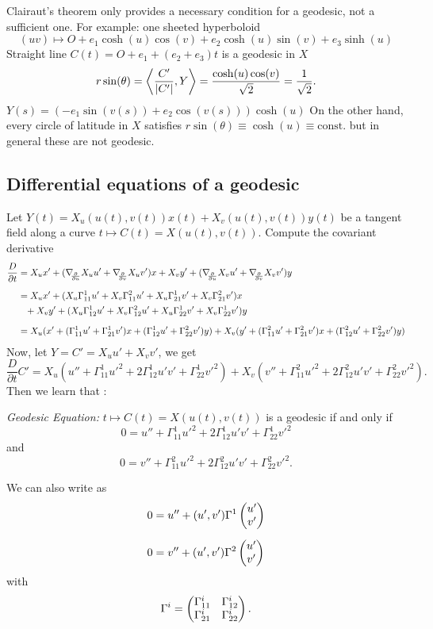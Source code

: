 \begin{remark, example}
	Clairaut's theorem only provides a necessary condition for a geodesic, not a sufficient one.
	For example: one sheeted hyperboloid
		\[ (uv) \mapsto O + e_1\cosh(u) \cos(v) + e_2 \cosh(u) \sin(v) + e_3 \sinh(u) \]
	Straight line $ C(t) = O + e_1 + (e_2 +e_3)t $ is a geodesic in $ X $
		\[r \sin (\theta) = \left \langle \dfrac{C'}{|C'|},Y \right\rangle = \dfrac{\cosh(u) \cos(v)}{\sqrt{2}}= \dfrac{1}{\sqrt{2}}. \]
	$ Y(s) = (-e_1\sin(v(s)) + e_2\cos(v(s)))\cosh(u) $
	On the other hand, every circle of latitude in $ X $ satisfies $ r\sin(\theta) \equiv \cosh(u) \equiv \mathrm{const.} $
	but in general these are not geodesic.	
\end{remark, example}

\subsection{Differential equations of a geodesic}
	
	Let $ Y(t) = X_u(u(t),v(t))x(t) + X_v(u(t),v(t))y(t) $ be a tangent field along a curve $ t \mapsto C(t) = X(u(t),v(t)). $
	Compute the covariant derivative
	\begin{align*}
		\dfrac{D}{\partial t} 
			&= X_ux' + (\nabla_{\!\!{\partial\over \partial u}} X_u u' + \nabla_{\!\!{\partial\over \partial v}} X_u v')x + X_vy' +  (\nabla_{\!\!{\partial\over \partial u}} X_v u' + \nabla_{\!\!{\partial\over \partial v}} X_v v')y \\[2mm]
		 &= X_ux' + (X_u\Gamma_{11}^1 u' + X_v\Gamma_{11}^2u' + X_u \Gamma_{21}^1v' + X_v \Gamma_{21}^2v')x \\
		 &\phantom{=} +  X_vy' + (X_u\Gamma_{12}^1 u' + X_v\Gamma_{12}^2u' + X_u \Gamma_{22}^1v' + X_v \Gamma_{22}^1v')y \\[2mm]
		 &= X_u(x' + (\Gamma_{11}^1u' + \Gamma_{21}^1v')x + (\Gamma_{12}^1 u' + \Gamma_{22}^2v')y) + X_v(y' + (\Gamma_{11}^2u' + \Gamma_{21}^2v')x + (\Gamma_{12}^2 u' + \Gamma_{22}^2v')y)
	\end{align*}
	Now, let $ Y = C' = X_u u' + X_v v' $, we get
		\[ \dfrac{D}{\partial t} C' = X_u(u'' + \Gamma_{11}^1u'^2 + 2 \Gamma_{12}^1 u'v' +\Gamma_{22}^1 v'^2) + X_v(v'' + \Gamma_{11}^2u'^2 + 2\Gamma_{12}^2u'v' + \Gamma_{22}^2v'^2). \]
	Then we learn that :
	
\begin{definition}
	\emph{Geodesic Equation:} \label{Eq: geodesic}
		$ t \mapsto C(t) = X(u(t),v(t)) $ is a geodesic if and only if
			\[ 0 = u'' + \Gamma_{11}^1u'^2 + 2 \Gamma_{12}^1 u'v' +\Gamma_{22}^1 v'^2 \]
		and
		\[ 0 = v'' + \Gamma_{11}^2u'^2 + 2\Gamma_{12}^2u'v' + \Gamma_{22}^2v'^2. \]
		
		We can also write as
		\begin{align*}
			0&= u'' +(u',v')\Gamma^1\begin{pmatrix} u'\\v' \end{pmatrix}\\[2mm]
			0&= v'' +(u',v')\Gamma^2\begin{pmatrix} u'\\v' \end{pmatrix}
		\end{align*}
		with
			\[ \Gamma^i = \begin{pmatrix} \Gamma_{11}^i & \Gamma_{12}^i\\
								\Gamma_{21}^i & \Gamma_{22}^i \end{pmatrix}. \]
		
\end{definition}

